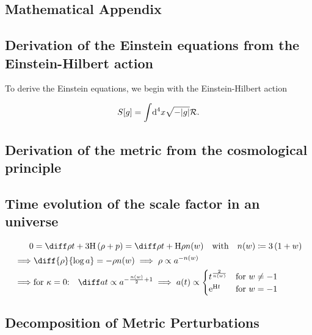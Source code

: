\documentclass[12pt,parskip=half]{scrreprt}
\begin{document}

\begin{appendices}


\chapter{Mathematical Appendix}

\section{Derivation of the Einstein equations from the Einstein-Hilbert action}\label{app:deriv_einstein_eqns}

To derive the Einstein equations, we begin with the Einstein-Hilbert action

\begin{align}
	S[g] = \int \! \dif{^4x} \sqrt{-|g|} \Rscal \eqpunct{.}
\end{align}


\section{Derivation of the \FLRW metric from the cosmological principle}\label{app:deriv_frw}

\section{Time evolution of the scale factor in an \FLRW universe}\label{app:deriv_frw_a_evol}

\begin{align}
	0 &= \dt{\rho} + 3\Hcosm\del{\rho + p} = \dt{\rho} + \Hcosm\rho \nexp \quad \text{with} \quad \nexp \defeq 3\del{1 + \eosp} \\
	\implies &\diff{\rho}{\efold} = -\rho\nexp \implies \rho \propto a^{-\nexp} \\
	\implies &\text{for \(\spatcurv=0\):} \quad \dt{a} \propto a^{-\frac{\nexp}{2}+1} \implies a(t) \propto
	\begin{cases}
		t^{\frac{2}{\nexp}} &\text{for \(\eosp\neq-1\)} \\
		\eul^{\Hcosm t} &\text{for \(\eosp=-1\)}
	\end{cases}
\end{align}


\section{Decomposition of Metric Perturbations}\label{app:deriv_decompose}


\end{appendices}
\end{document}

